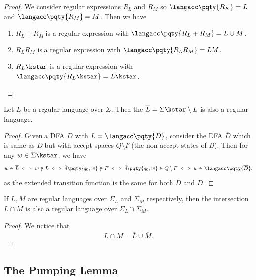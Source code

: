 \begin{proof}
    We consider regular expressions \(R_L\) and \(R_M\) so \(\langacc\pqty{R_K} = L\) and \(\langacc\pqty{R_M} = M\). Then we have
    \begin{enumerate}[label=(\arabic*)]
        \item \(R_L + R_M\) is a regular expression with \(\langacc\pqty{R_L + R_M} = L \cup M\).
        \item \(R_L R_M\) is a regular expression with \(\langacc\pqty{R_L R_M} = LM\).
        \item \(R_L\kstar\) is a regular expression with \(\langacc\pqty{R_L\kstar} = L\kstar\).
    \end{enumerate}
\end{proof}

\begin{theorem}
    Let \(L\) be a regular language over \(\Sigma\). Then the  \(\overline{L} = \Sigma\kstar \setminus L\) is also a regular language.
\end{theorem}

\begin{proof}
    Given a DFA \(D\) with \(L = \langacc\pqty{D}\), consider the DFA \(\overline{D}\) which is same as \(D\) but with accept spaces \(Q \setminus F\) (the non-accept states of \(D\)). Then for any \(w \in \Sigma\kstar\), we have
    \[
        w \in \overline{L} \iff w \notin L \iff \hat{\delta} \pqty{q_0, w} \notin F \iff \hat{\delta} \pqty{q_0, w} \in Q \setminus F \iff w \in \langacc\pqty{\overline{D}}.
    \]
    as the extended transition function is the same for both \(D\) and \(\overline{D}\).
\end{proof}

\begin{corollary}
    If \(L, M\) are regular languages over \(\Sigma_L\) and \(\Sigma_M\) respectively, then the intersection \(L \cap M\) is also a regular language over \(\Sigma_L \cap \Sigma_M\).
\end{corollary}

\begin{proof}
    We notice that
    \[
        L \cap M = \overline{\overline{L} \cup \overline{M}}.
    \]
\end{proof}

\subsection{The Pumping Lemma}

